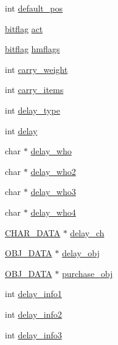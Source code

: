 \begin{DoxyCompactItemize}
\item 
int \hyperlink{structchar__data_a3adaf66523d54655cb21d51f346ba6e5}{default\-\_\-pos}
\item 
\hyperlink{structs_8h_af5b34f10bae6d3b8f168d5eb6fab2925}{bitflag} \hyperlink{structchar__data_a556de4fce697cbec20ab6d1c7af5325b}{act}
\item 
\hyperlink{structs_8h_af5b34f10bae6d3b8f168d5eb6fab2925}{bitflag} \hyperlink{structchar__data_a11092e38acf989ad13c3463ef7bc7833}{hmflags}
\item 
int \hyperlink{structchar__data_a115846fa304ff669715d2796d8ca7586}{carry\-\_\-weight}
\item 
int \hyperlink{structchar__data_a2d23f0d9ad49b5028c8f36d54c3ce5fc}{carry\-\_\-items}
\item 
int \hyperlink{structchar__data_a7199125dd6eb865709c10edadaebbac3}{delay\-\_\-type}
\item 
int \hyperlink{structchar__data_a3be7826be8044e970d4da93f7f00066f}{delay}
\item 
char $\ast$ \hyperlink{structchar__data_aefcb99fe8dc01457bde88edf2da8d807}{delay\-\_\-who}
\item 
char $\ast$ \hyperlink{structchar__data_aa5e086edc4d99cec82bf4edacc17b5bb}{delay\-\_\-who2}
\item 
char $\ast$ \hyperlink{structchar__data_a08eb8e20a6a85f56349189b4d3e618a0}{delay\-\_\-who3}
\item 
char $\ast$ \hyperlink{structchar__data_a8b7d469d9054012c839b2e7c2f027951}{delay\-\_\-who4}
\item 
\hyperlink{structs_8h_af33ed1e66e8541a08bed257124f50f31}{C\-H\-A\-R\-\_\-\-D\-A\-T\-A} $\ast$ \hyperlink{structchar__data_a194b886dcc3de8dafcdcbc357ca5e686}{delay\-\_\-ch}
\item 
\hyperlink{structs_8h_aaa59141dfc8c6ecdb6bfcf1537dd52d1}{O\-B\-J\-\_\-\-D\-A\-T\-A} $\ast$ \hyperlink{structchar__data_a424eabdb1bde9c47ff497ea9985de21a}{delay\-\_\-obj}
\item 
\hyperlink{structs_8h_aaa59141dfc8c6ecdb6bfcf1537dd52d1}{O\-B\-J\-\_\-\-D\-A\-T\-A} $\ast$ \hyperlink{structchar__data_a09095c42ce7540e636e975d54e56f7ee}{purchase\-\_\-obj}
\item 
int \hyperlink{structchar__data_a9ddb83c8fbb762f73f3cd8ad05ae545b}{delay\-\_\-info1}
\item 
int \hyperlink{structchar__data_ac76b6bebc4773a8f1012fc7421ea1d17}{delay\-\_\-info2}
\item 
int \hyperlink{structchar__data_a1f242e83c79162132832d87597aa758c}{delay\-\_\-info3}

\end{DoxyCompactItemize}
